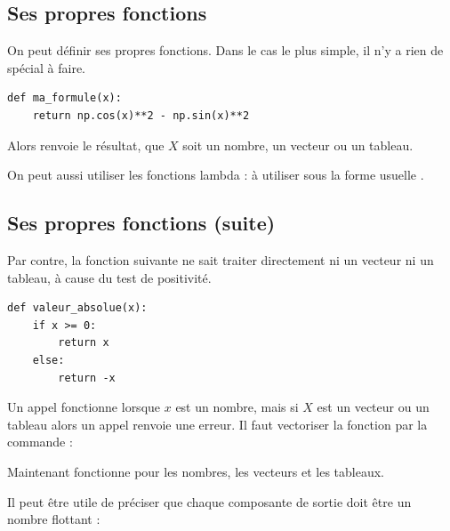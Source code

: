 \documentclass[11pt,class=report,crop=false]{standalone}
\begin{document}
\subsection{Ses propres fonctions}

On peut définir ses propres fonctions.
Dans le cas le plus simple, il n'y a rien de spécial à faire.

\begin{center}
\begin{minipage}{0.9\textwidth}
\begin{lstlisting}    
def ma_formule(x):
	return np.cos(x)**2 - np.sin(x)**2
\end{lstlisting}
\end{minipage}
\end{center}
Alors  renvoie le résultat, que $X$ soit un nombre, un vecteur ou un tableau.

On peut aussi utiliser les fonctions \og{}lambda\fg{} :
à utiliser sous la forme usuelle .


\subsection{Ses propres fonctions (suite)}

Par contre, la fonction suivante ne sait traiter directement ni un vecteur ni un tableau, à cause du test de positivité.
\begin{center}
\begin{minipage}{0.9\textwidth}
\begin{lstlisting} 
def valeur_absolue(x):
	if x >= 0:
		return x
	else:
		return -x
\end{lstlisting}
\end{minipage}
\end{center}


Un appel  fonctionne lorsque $x$ est un nombre, mais si $X$ est un vecteur ou un tableau alors un appel  renvoie une erreur. Il faut \og{}vectoriser\fg{} la fonction par la commande :

Maintenant  fonctionne pour les nombres, les vecteurs et les tableaux.

\begin{remarque*}
Il peut être utile de préciser que chaque composante de sortie doit être un nombre flottant :

\end{remarque*}
\end{document}
